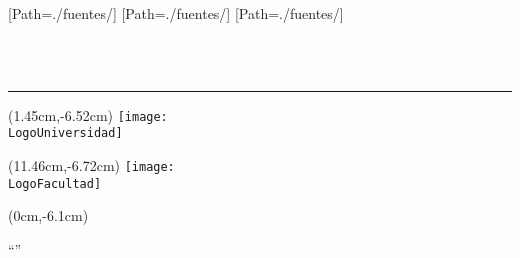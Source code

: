 
\newfontfamily{}[Path=./fuentes/] 
\newfontfamily{}[Path=./fuentes/] 
\newfontfamily{}[Path=./fuentes/] 

\begin{titlepage}


\thispagestyle{empty}

\noindent\begin{minipage}{\textwidth}
\centering
 {\ArialMT\fontsize{20pt}{25pt}
 {
 {\MakeUppercase\Universidad}}}\\[0.5cm]
 {\ArialBoldMT\fontsize{14pt}{17pt}
 {}}\\[0.42cm] 
 {\ArialBoldMT\fontsize{13pt}{16pt}
 {}}
\noindent\rule[-0.22cm]{\textwidth}{5pt} %
\end{minipage}

\vfill

\begin{textblock*}{4cm}(1.45cm,-6.52cm)%
	 \texttt{[image: \\LogoUniversidad]}
\end{textblock*}
\begin{textblock*}{3cm}(11.46cm,-6.72cm)%
	 \texttt{[image: \\LogoFacultad]}
\end{textblock*}

\vfill

\begin{textblock*}{\textwidth}(0cm,-6.1cm)%
\noindent
\begin{minipage}{\textwidth}
\begin{spacing}{2.1}
 \centering
  {\fontsize{25pt}{30pt}\ArialBoldMT
  {\addfontfeature{}
 \textquotedblleft\titulo\textquotedblright}}
\end{spacing}
\end{minipage}
\end{textblock*}


\end{titlepage}
